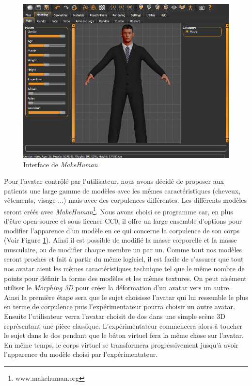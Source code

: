 \begin{figure}[!h]
   	\centerline{\includegraphics[scale=0.4]{images/makeHuman}}
   	\caption{\label{fig11} Interface de \emph{MakeHuman}}
\end{figure}

Pour l'avatar contrôlé par l'utilisateur, nous avons décidé de proposer aux patients une large gamme de modèles avec les mêmes caractéristiques (cheveux, vêtements, visage ...) mais avec des corpulences différentes. Les différents modèles seront créés avec \emph{MakeHuman}\footnote{www.makehuman.org}. Nous avons choisi ce programme car, en plus d'être open-source et sous licence CC0, il offre un large ensemble d'options pour modifier l'apparence d'un modèle en ce qui concerne la corpulence de son corps (Voir Figure \ref{fig11}). Ainsi il est possible de modifié la masse corporelle et la masse musculaire, ou de modifier chaque membre un par un. Comme tout nos modèles seront proches et fait à partir du même logiciel, il est facile de s'assurer que tout nos avatar aient les mêmes caractéristiques technique tel que le même nombre de points pour définir la forme des modèles et les mêmes textures. On peut aisément utiliser le \emph{Morphing 3D} pour créer la déformation d'un avatar vers un autre.\\

Ainsi la première étape sera que le sujet choisisse l'avatar qui lui ressemble le plus en terme de corpulence puis l'expérimentateur pourra choisir un autre avatar. Ensuite l'utilisateur verra l'avatar choisit de dos dans une simple scène 3D représentant une pièce classique. L'expérimentateur commencera alors à toucher le sujet dans le dos pendant que le bâton virtuel fera la même chose sur l'avatar. En même temps, le corps virtuel se transformera progressivement jusqu'à avoir l'apparence du modèle choisi par l'expérimentateur. 
